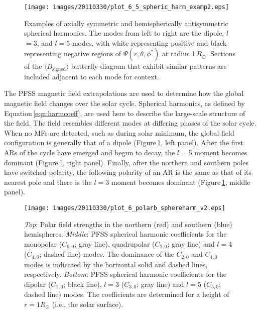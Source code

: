 \documentclass[namedreferences]{solarphysics}
\begin{document}
\begin{article}
\begin{figure}[!t]
\begin{center}
\texttt{[image: images/20110330/plot\_6\_5\_spheric\_harm\_examp2.eps]}
\end{center}
\caption{Examples of axially symmetric and hemispherically antisymmetric spherical harmonics. The modes from left to right are the dipole, $l$$=$3, and $l$$=$5 modes, with white representing positive and black representing negative regions of $\Psi(r,\theta,\phi^*)$ at radius 1\,$R_{\odot}$. Sections of the $\langle B_{\mathrm{signed}} \rangle$ butterfly diagram that exhibit similar patterns are included adjacent to each mode for context.}
\label{plot_6_5_spheric_harm_examp}
\end{figure}

The PFSS magnetic field extrapolations are used to determine how the global magnetic field changes over the solar cycle. Spherical harmonics, as defined by Equation\,\ref{eqn:harmcoeff}, are used here to describe the large-scale structure of the field. The field resembles different modes at differing phases of the solar cycle. When no MFs are detected, such as during solar minimum, the global field configuration is generally that of a dipole (Figure\,\ref{plot_6_5_spheric_harm_examp}, left panel). After the first ARs of the cycle have emerged and begun to decay, the $l$$=$5 moment becomes dominant (Figure\,\ref{plot_6_5_spheric_harm_examp}, right panel). Finally, after the northern and southern poles have switched polarity, the following polarity of an AR is the same as that of its nearest pole and there is the $l$$=$3 moment becomes dominant (Figure\,\ref{plot_6_5_spheric_harm_examp}, middle panel).


\begin{figure*}[!t]
\sidecaption
\texttt{[image: images/20110330/plot\_6\_polarb\_sphereharm\_v2.eps]}
\caption{\emph{Top}: Polar field strengths in the northern (red) and southern (blue) hemispheres. \emph{Middle}: PFSS spherical harmonic coefficients for the monopolar ($C_{0,0}$; gray line), quadrupolar ($C_{2,0}$; gray line) and $l$$=$4 ($C_{4,0}$; dashed line) modes. The dominance of the $C_{2,0}$ and $C_{4,0}$ modes is indicated by the horizontal solid and dashed lines, respectively. \emph{Bottom}: PFSS spherical harmonic coefficients for the dipolar ($C_{1,0}$; black line), $l$$=$3 ($C_{3,0}$; gray line) and $l$$=$5 ($C_{5,0}$; dashed line) modes. The coefficients are determined for a height of $r=1R_{\odot}$ (i.e., the solar surface).}
\label{plot_6_polarb_sphereharm}
\end{figure*}



\end{article}
\end{document}
